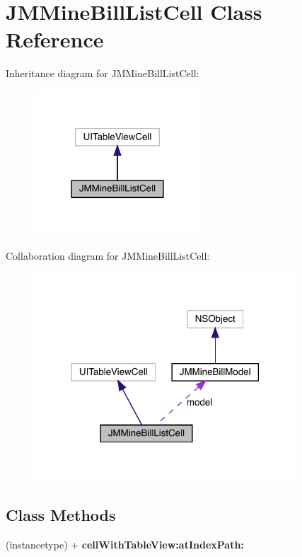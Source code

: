 \hypertarget{interface_j_m_mine_bill_list_cell}{}\section{J\+M\+Mine\+Bill\+List\+Cell Class Reference}
\label{interface_j_m_mine_bill_list_cell}


Inheritance diagram for J\+M\+Mine\+Bill\+List\+Cell\+:\nopagebreak
\begin{figure}[H]
\begin{center}
\leavevmode
\includegraphics[width=177pt]{interface_j_m_mine_bill_list_cell__inherit__graph}
\end{center}
\end{figure}


Collaboration diagram for J\+M\+Mine\+Bill\+List\+Cell\+:\nopagebreak
\begin{figure}[H]
\begin{center}
\leavevmode
\includegraphics[width=278pt]{interface_j_m_mine_bill_list_cell__coll__graph}
\end{center}
\end{figure}
\subsection*{Class Methods}
\begin{DoxyCompactItemize}
\item 
\mbox{\label{interface_j_m_mine_bill_list_cell_a47972d0e8021afefabad82a25d3c728c}} 
(instancetype) + {\bfseries cell\+With\+Table\+View\+:at\+Index\+Path\+:}
\end{DoxyCompactItemize}

